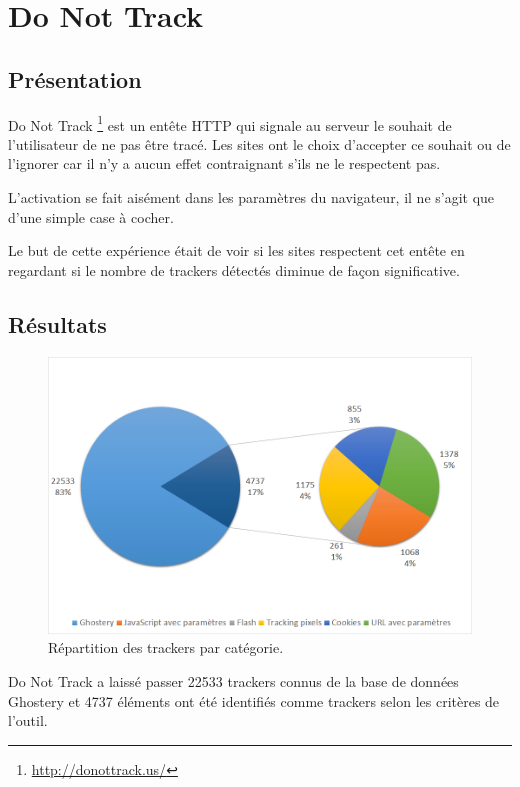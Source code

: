 \section{Do Not Track}
\subsection{Présentation}
Do Not Track \footnote{\url{http://donottrack.us/}} est un entête HTTP qui signale au serveur le souhait de l'utilisateur de ne pas être tracé. Les sites ont le choix d'accepter ce souhait ou de l'ignorer car il n'y a aucun effet contraignant s'ils ne le respectent pas.

L'activation se fait aisément dans les paramètres du navigateur, il ne s'agit que d'une simple case à cocher.

Le but de cette expérience était de voir si les sites respectent cet entête en regardant si le nombre de trackers détectés diminue de façon significative.

\subsection{Résultats}%
\begin{figure}[!h]
	\centering
	\includegraphics[scale=.6]{resultats/ANALYSES/Images/DNT-Ghostery.png}
	\caption{\label{exp-DNT-ghostery}Répartition des trackers par catégorie.}
\end{figure}

Do Not Track a laissé passer 22533 trackers connus de la base de données Ghostery et 4737 éléments ont été identifiés comme trackers selon les critères de l'outil.\\

